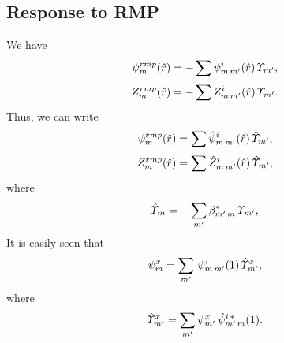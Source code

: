 \documentclass[12pt,prb,aps,notitlepage]{revtex4-1}
\begin{document}
\subsection{Response to RMP}
We have
\begin{align}
\psi_m^{rmp}(\hat{r})&=-\sum \psi^i_{m\,m'}(\hat{r})\,{\mit\Upsilon}_{m'},\\[0.5ex]
Z_m^{rmp}(\hat{r})&=-\sum Z^i_{m\,m'}(\hat{r})\,{\mit\Upsilon}_{m'}.
\end{align}
Thus, we can write 
\begin{align}
\psi_m^{rmp}(\hat{r})&=\sum \hat{\psi}^i_{m\,m'}(\hat{r})\,\hat{\mit\Upsilon}_{m'},\\[0.5ex]
Z_m^{rmp}(\hat{r})&=\sum \hat{Z}^i_{m\,m'}(\hat{r})\,\hat{\mit\Upsilon}_{m'},
\end{align}
where
\begin{align}
\hat{\mit\Upsilon}_{m} =- \sum_{m'}\beta_{m'\,m}^\ast\,{\mit\Upsilon}_{m'},
\end{align}
It is easily seen that
\begin{equation}
\psi^x_m = \sum_{m'}\,\psi^i_{m\,m'}(1)\,\hat{\mit\Upsilon}_{m'}^x,
\end{equation}
where
\begin{equation}
\hat{\mit\Upsilon}_{m'}^x= \sum_{m'} \psi_{m'}^x\,\hat{\psi}_{m'\,m}^{i\,\ast}(1).
\end{equation}
\end{document}
